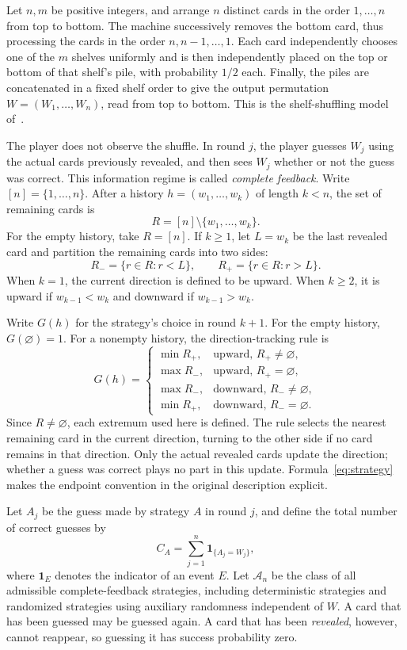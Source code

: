 \documentclass[10pt,a4paper]{amsart}
\numberwithin{equation}{section}
\begin{document}
Let $n,m$ be positive integers, and arrange $n$ distinct cards in the order $1,\ldots,n$ from top to bottom. The machine successively removes the bottom card, thus processing the cards in the order $n,n-1,\ldots,1$. Each card independently chooses one of the $m$ shelves uniformly and is then independently placed on the top or bottom of that shelf's pile, with probability $1/2$ each. Finally, the piles are concatenated in a fixed shelf order to give the output permutation $W=(W_1,\ldots,W_n)$, read from top to bottom. This is the shelf-shuffling model of~\cite[Section 3.1]{DFH}.

The player does not observe the shuffle. In round $j$, the player guesses $W_j$ using the actual cards previously revealed, and then sees $W_j$ whether or not the guess was correct. This information regime is called \emph{complete feedback}. Write $[n]=\{1,\ldots,n\}$. After a history $h=(w_1,\ldots,w_k)$ of length $k<n$, the set of remaining cards is
\[
 R=[n]\setminus\{w_1,\ldots,w_k\}.
\]
For the empty history, take $R=[n]$. If $k\ge1$, let $L=w_k$ be the last revealed card and partition the remaining cards into two sides:
\[
 R_- =\{r\in R:r<L\},\qquad R_+=\{r\in R:r>L\}.
\]
When $k=1$, the current direction is defined to be upward. When $k\ge2$, it is upward if $w_{k-1}<w_k$ and downward if $w_{k-1}>w_k$.

Write $G(h)$ for the strategy's choice in round $k+1$. For the empty history, $G(\varnothing)=1$. For a nonempty history, the direction-tracking rule is
\begin{equation}\label{eq:strategy}
G(h)=
\begin{cases}
\min R_+, & \text{upward, }R_+\ne\varnothing,\\
\max R_-, & \text{upward, }R_+=\varnothing,\\
\max R_-, & \text{downward, }R_-\ne\varnothing,\\
\min R_+, & \text{downward, }R_-=\varnothing.
\end{cases}
\end{equation}
Since $R\ne\varnothing$, each extremum used here is defined. The rule selects the nearest remaining card in the current direction, turning to the other side if no card remains in that direction. Only the actual revealed cards update the direction; whether a guess was correct plays no part in this update. Formula~\eqref{eq:strategy} makes the endpoint convention in the original description explicit.

Let $A_j$ be the guess made by strategy $A$ in round $j$, and define the total number of correct guesses by
\[
 C_A=\sum_{j=1}^n\mathbf1_{\{A_j=W_j\}},
\]
where $\mathbf1_E$ denotes the indicator of an event $E$. Let $\mathcal A_n$ be the class of all admissible complete-feedback strategies, including deterministic strategies and randomized strategies using auxiliary randomness independent of $W$. A card that has been guessed may be guessed again. A card that has been \emph{revealed}, however, cannot reappear, so guessing it has success probability zero.
\end{document}
